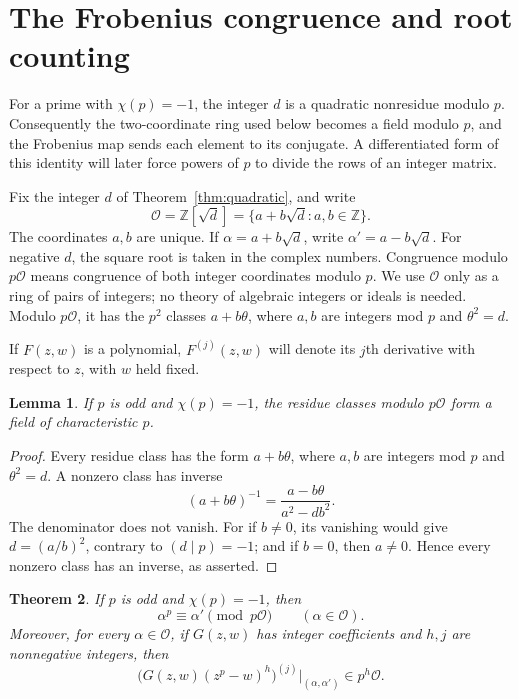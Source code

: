 \documentclass[11pt,twoside,leqno]{article}
\theoremstyle{apostol}
\newtheorem{theorem}{Theorem}
\newtheorem{lemma}[theorem]{Lemma}
\newcommand{\Z}{\mathbb Z}
\newcommand{\cO}{\mathcal O}
\newcommand{\ls}[2]{(#1\mid #2)}
\begin{document}
\section{The Frobenius congruence and root counting}
\label{sec:frobenius}

For a prime with \(\chi(p)=-1\), the integer \(d\) is a quadratic
nonresidue modulo \(p\). Consequently the two-coordinate ring used below
becomes a field modulo \(p\), and the Frobenius map sends each element to its
conjugate. A differentiated form of this identity will later force powers of
\(p\) to divide the rows of an integer matrix.

Fix the integer \(d\) of Theorem~\ref{thm:quadratic}, and write
\[
 \cO=\Z[\sqrt d]=\{a+b\sqrt d:a,b\in\Z\}.
\]
The coordinates \(a,b\) are unique. If \(\alpha=a+b\sqrt d\), write
\(\alpha'=a-b\sqrt d\). For negative \(d\), the square root is
taken in the complex numbers. Congruence modulo \(p\cO\) means
congruence of both integer coordinates modulo \(p\).
We use \(\cO\) only as a ring of pairs of integers; no theory of algebraic
integers or ideals is needed. Modulo \(p\cO\), it has the \(p^2\) classes
\(a+b\theta\), where \(a,b\) are integers mod \(p\) and \(\theta^2=d\).

If \(F(z,w)\) is a polynomial, \(F^{(j)}(z,w)\) will denote its \(j\)th
derivative with respect to \(z\), with \(w\) held fixed.

\begin{lemma}\label{lem:residuefield}
If \(p\) is odd and \(\chi(p)=-1\), the residue classes modulo \(p\cO\)
form a field of characteristic \(p\).
\end{lemma}

\begin{proof}
Every residue class has the form \(a+b\theta\), where \(a,b\) are
integers mod \(p\) and \(\theta^2=d\). A nonzero class has inverse
\[
 (a+b\theta)^{-1}=\frac{a-b\theta}{a^2-db^2}.
\]
The denominator does not vanish. For if \(b\ne0\), its vanishing would
give \(d=(a/b)^2\), contrary to \(\ls d p=-1\); and if \(b=0\), then
\(a\ne0\). Hence every nonzero class has an inverse, as asserted.
\end{proof}

\begin{theorem}\label{thm:frobenius}
If \(p\) is odd and \(\chi(p)=-1\), then
\begin{equation}\label{eq:frobenius}
 \alpha^p\equiv\alpha'\pmod{p\cO}\qquad(\alpha\in\cO).
\end{equation}
Moreover, for every \(\alpha\in\cO\), if \(G(z,w)\) has integer coefficients
and \(h,j\) are nonnegative integers, then
\begin{equation}\label{eq:stable}
 \bigl(G(z,w)(z^p-w)^h\bigr)^{(j)}\big|_{(\alpha,\alpha')}
       \in p^h\cO.
\end{equation}
\end{theorem}
\end{document}
